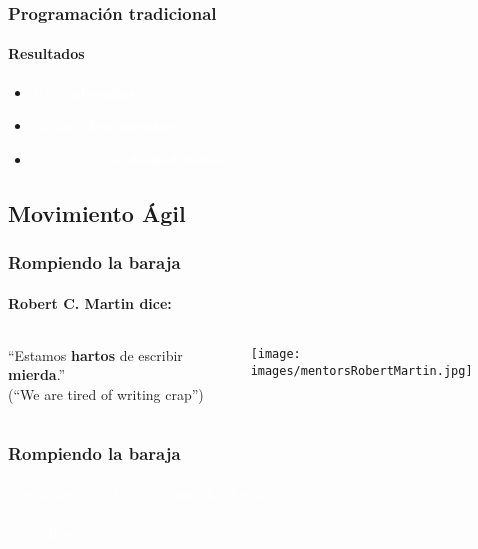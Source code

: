    {

   \begin{frame}
    \frametitle{Programación tradicional}
    \framesubtitle{Resultados}

    \begin{itemize}
     \item \textcolor{white}{Jefes \textbf{cabreados}.}
     \item  \textcolor{white}{Clientes \textbf{descontentos}.}
     \item  \textcolor{white}{Programadores \textbf{desmotivados}.}
    \end{itemize}
   \end{frame}
   }

  \subsection{Movimiento Ágil}


  \begin{frame}
   \frametitle{Rompiendo la baraja}
   \framesubtitle{Robert C. Martin dice:}

   \begin{columns}
    \begin{column}{7cm}
     \begin{center}
    ``Estamos \textbf{hartos} de escribir \textbf{mierda}.''\\[3pc]
    (``We are tired of writing crap'')
     \end{center}
    \end{column}
    \begin{column}{4cm}
      \texttt{[image: images/mentorsRobertMartin.jpg]}
    \end{column}
   \end{columns}
  \end{frame}


  {
   \begin{frame}
    \frametitle{Rompiendo la baraja}
    \framesubtitle{}

    \vspace{4cm}
    \textcolor{white}{
    Si siempre haces lo que siempre has hecho,\\
    nunca llegarás más lejos de donde siempre has llegado.\\
    (Juan Bernat)
    }
   \end{frame}
  }


